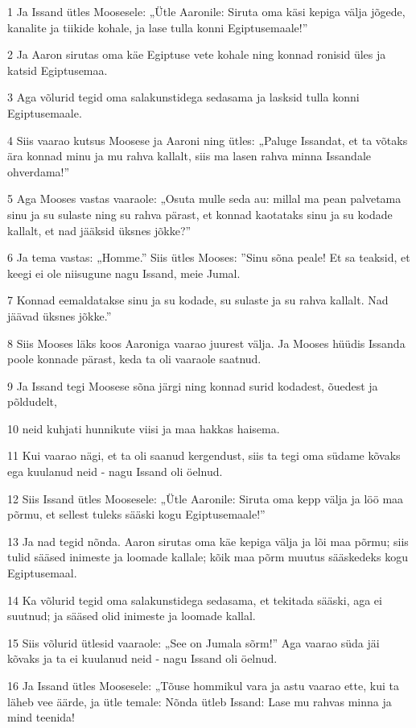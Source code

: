 \par 1 Ja Issand ütles Moosesele: „Ütle Aaronile: Siruta oma käsi kepiga välja jõgede, kanalite ja tiikide kohale, ja lase tulla konni Egiptusemaale!”
\par 2 Ja Aaron sirutas oma käe Egiptuse vete kohale ning konnad ronisid üles ja katsid Egiptusemaa.
\par 3 Aga võlurid tegid oma salakunstidega sedasama ja lasksid tulla konni Egiptusemaale.
\par 4 Siis vaarao kutsus Moosese ja Aaroni ning ütles: „Paluge Issandat, et ta võtaks ära konnad minu ja mu rahva kallalt, siis ma lasen rahva minna Issandale ohverdama!”
\par 5 Aga Mooses vastas vaaraole: „Osuta mulle seda au: millal ma pean palvetama sinu ja su sulaste ning su rahva pärast, et konnad kaotataks sinu ja su kodade kallalt, et nad jääksid üksnes jõkke?”
\par 6 Ja tema vastas: „Homme.” Siis ütles Mooses: ”Sinu sõna peale! Et sa teaksid, et keegi ei ole niisugune nagu Issand, meie Jumal.
\par 7 Konnad eemaldatakse sinu ja su kodade, su sulaste ja su rahva kallalt. Nad jäävad üksnes jõkke.”
\par 8 Siis Mooses läks koos Aaroniga vaarao juurest välja. Ja Mooses hüüdis Issanda poole konnade pärast, keda ta oli vaaraole saatnud.
\par 9 Ja Issand tegi Moosese sõna järgi ning konnad surid kodadest, õuedest ja põldudelt,
\par 10 neid kuhjati hunnikute viisi ja maa hakkas haisema.
\par 11 Kui vaarao nägi, et ta oli saanud kergendust, siis ta tegi oma südame kõvaks ega kuulanud neid - nagu Issand oli öelnud.
\par 12 Siis Issand ütles Moosesele: „Ütle Aaronile: Siruta oma kepp välja ja löö maa põrmu, et sellest tuleks sääski kogu Egiptusemaale!”
\par 13 Ja nad tegid nõnda. Aaron sirutas oma käe kepiga välja ja lõi maa põrmu; siis tulid sääsed inimeste ja loomade kallale; kõik maa põrm muutus sääskedeks kogu Egiptusemaal.
\par 14 Ka võlurid tegid oma salakunstidega sedasama, et tekitada sääski, aga ei suutnud; ja sääsed olid inimeste ja loomade kallal.
\par 15 Siis võlurid ütlesid vaaraole: „See on Jumala sõrm!” Aga vaarao süda jäi kõvaks ja ta ei kuulanud neid - nagu Issand oli öelnud.
\par 16 Ja Issand ütles Moosesele: „Tõuse hommikul vara ja astu vaarao ette, kui ta läheb vee äärde, ja ütle temale: Nõnda ütleb Issand: Lase mu rahvas minna ja mind teenida!
